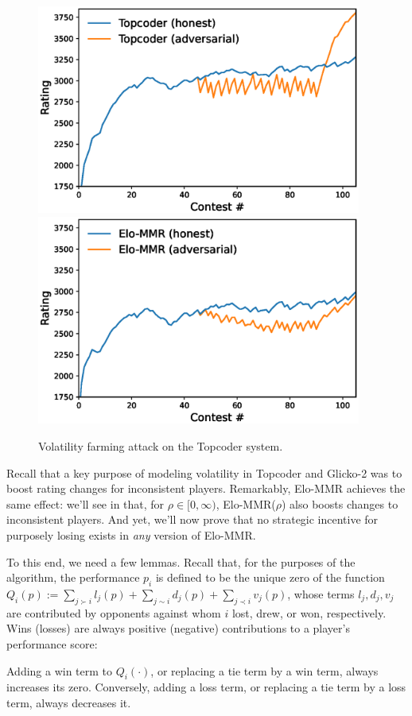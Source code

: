 \begin{figure}
\begin{minipage}{0.50\textwidth}
    \includegraphics[width=0.95\textwidth]{images/topcoder.eps}
    \includegraphics[width=0.95\textwidth]{images/elo-mmr.eps}
\end{minipage}
    \caption{Volatility farming attack on the Topcoder system.}
    \label{fig:topcoder-gaming}
\end{figure}

Recall that a key purpose of modeling volatility in Topcoder and Glicko-2 was to boost rating changes for inconsistent players. Remarkably, Elo-MMR achieves the same effect: we'll see in  that, for $\rho\in [0,\infty)$, Elo-MMR($\rho$) also boosts changes to inconsistent players. And yet, we'll now prove that no strategic incentive for purposely losing exists in \emph{any} version of Elo-MMR.

To this end, we need a few lemmas. Recall that, for the purposes of the algorithm, the performance $p_i$ is defined to be the unique zero of the function $Q_i(p) := \sum_{j \succ i} l_j(p) + \sum_{j \sim i} d_j(p) + \sum_{j \prec i} v_j(p)$, whose terms $l_j,d_j,v_j$ are contributed by opponents against whom $i$ lost, drew, or won, respectively. Wins (losses) are always positive (negative) contributions to a player's performance score:
\begin{lemma}
\label{lem:mono-term}
Adding a win term to $Q_i(\cdot)$, or replacing a tie term by a win term, always increases its zero. Conversely, adding a loss term, or replacing a tie term by a loss term, always decreases it.
\end{lemma}

